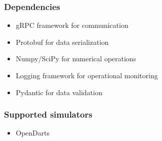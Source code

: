 \subsubsection{Dependencies}

\begin{itemize}
	\item gRPC framework for communication
	\item Protobuf for data serialization
	\item Numpy/SciPy for numerical operations
	\item Logging framework for operational monitoring
	\item Pydantic for data validation
\end{itemize}

\subsubsection{Supported simulators}
\begin{itemize}
	\item OpenDarts
\end{itemize}
